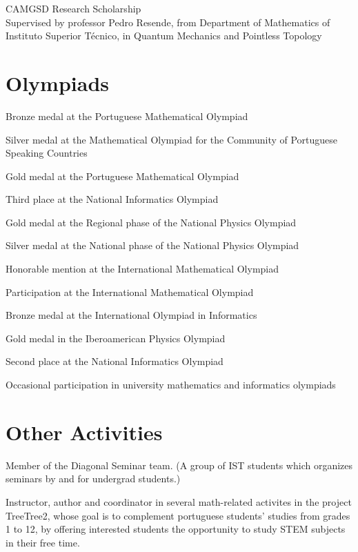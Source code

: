 \documentclass[11pt]{article} %
\begin{document}
 CAMGSD Research Scholarship\\
Supervised by professor Pedro Resende, from Department of Mathematics of Instituto Superior Técnico, in Quantum Mechanics and Pointless Topology

\section*{Olympiads}

 \entry Bronze medal at the Portuguese Mathematical Olympiad
\smallskip

\entry Silver medal at the Mathematical Olympiad for the Community of Portuguese Speaking Countries
\smallskip

 \entry Gold medal at the Portuguese Mathematical Olympiad
\smallskip

\entry Third place at the National Informatics Olympiad
\smallskip

\entry Gold medal at the Regional phase of the National Physics Olympiad
\smallskip

\entry Silver medal at the National phase of the National Physics Olympiad
\smallskip

\entry Honorable mention at the International Mathematical Olympiad
\smallskip

 \entry Participation at the International Mathematical Olympiad
\smallskip

\entry Bronze medal at the International Olympiad in Informatics
\smallskip

\entry Gold medal in the Iberoamerican Physics Olympiad
\smallskip

\entry Second place at the National Informatics Olympiad
\smallskip

 \entry Occasional participation in university mathematics and informatics olympiads

\section*{Other Activities}

 \entry Member of the Diagonal Seminar team. (A group of IST students which organizes seminars by and for undergrad students.)

 \entry Instructor, author and coordinator in several math-related activites in the project TreeTree2, whose goal is to complement portuguese students' studies from grades 1 to 12, by offering interested students the opportunity to study STEM subjects in their free time.




%
%
\end{document}
